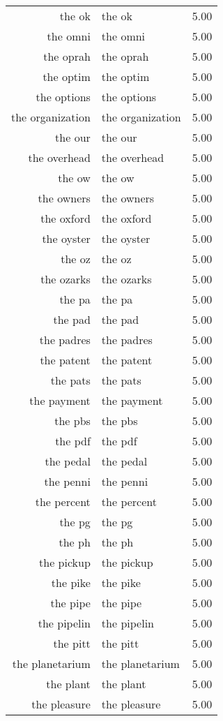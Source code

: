 \begin{table}[ht]
\begin{tabular}{rlr}
  the ok & the ok & 5.00 \\ 
  the omni & the omni & 5.00 \\ 
  the oprah & the oprah & 5.00 \\ 
  the optim & the optim & 5.00 \\ 
  the options & the options & 5.00 \\ 
  the organization & the organization & 5.00 \\ 
  the our & the our & 5.00 \\ 
  the overhead & the overhead & 5.00 \\ 
  the ow & the ow & 5.00 \\ 
  the owners & the owners & 5.00 \\ 
  the oxford & the oxford & 5.00 \\ 
  the oyster & the oyster & 5.00 \\ 
  the oz & the oz & 5.00 \\ 
  the ozarks & the ozarks & 5.00 \\ 
  the pa & the pa & 5.00 \\ 
  the pad & the pad & 5.00 \\ 
  the padres & the padres & 5.00 \\ 
  the patent & the patent & 5.00 \\ 
  the pats & the pats & 5.00 \\ 
  the payment & the payment & 5.00 \\ 
  the pbs & the pbs & 5.00 \\ 
  the pdf & the pdf & 5.00 \\ 
  the pedal & the pedal & 5.00 \\ 
  the penni & the penni & 5.00 \\ 
  the percent & the percent & 5.00 \\ 
  the pg & the pg & 5.00 \\ 
  the ph & the ph & 5.00 \\ 
  the pickup & the pickup & 5.00 \\ 
  the pike & the pike & 5.00 \\ 
  the pipe & the pipe & 5.00 \\ 
  the pipelin & the pipelin & 5.00 \\ 
  the pitt & the pitt & 5.00 \\ 
  the planetarium & the planetarium & 5.00 \\ 
  the plant & the plant & 5.00 \\ 
  the pleasure & the pleasure & 5.00 \\ 

\end{tabular}
\end{table}

